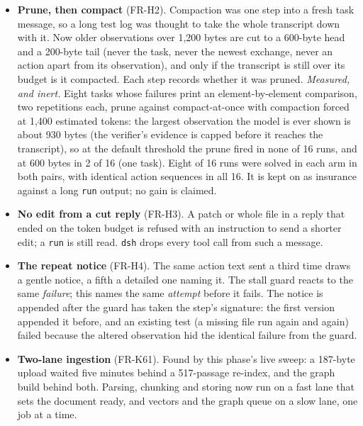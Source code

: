 \begin{itemize}
  last call plus bytes/3 of what was appended since, cleared by a prune or a compaction. On a CPU where prefill is the cost, the difference between an
  estimate and the server's count is the difference between compacting at the right step and the wrong one.
\item \textbf{Prune, then compact} (FR-H2). Compaction was one step into a fresh task message, so a long test log was thought to take the whole transcript down with it.
  Now older observations over 1,200 bytes are cut to a 600-byte head and a 200-byte tail (never the task, never the newest exchange, never an action apart
  from its observation), and only if the transcript is still over its budget is it compacted. Each step records whether it was pruned.
  \emph{Measured, and inert.} Eight tasks whose failures print an element-by-element comparison, two repetitions each, prune against compact-at-once with
  compaction forced at 1,400 estimated tokens: the largest observation the model is ever shown is about 930 bytes (the verifier's evidence is capped before
  it reaches the transcript), so at the default threshold the prune fired in none of 16 runs, and at 600 bytes in 2 of 16 (one task). Eight of 16 runs were
  solved in each arm in both pairs, with identical action sequences in all 16. It is kept on as insurance against a long \texttt{run} output; no gain is claimed.
\item \textbf{No edit from a cut reply} (FR-H3). A patch or whole file in a reply that ended on the token budget is refused with an instruction to send a
  shorter edit; a \texttt{run} is still read. \texttt{dsh} drops every tool call from such a message.
\item \textbf{The repeat notice} (FR-H4). The same action text sent a third time draws a gentle notice, a fifth a detailed one naming it. The stall guard
  reacts to the same \emph{failure}; this names the same \emph{attempt} before it fails. The notice is appended after the guard has taken the step's
  signature: the first version appended it before, and an existing test (a missing file run again and again) failed because the altered observation hid
  the identical failure from the guard.
\item \textbf{Two-lane ingestion} (FR-K61). Found by this phase's live sweep: a 187-byte upload waited five minutes behind a 517-passage re-index, and the
  graph build behind both. Parsing, chunking and storing now run on a fast lane that sets the document ready, and vectors and the graph queue on a slow
  lane, one job at a time.
\end{itemize}


